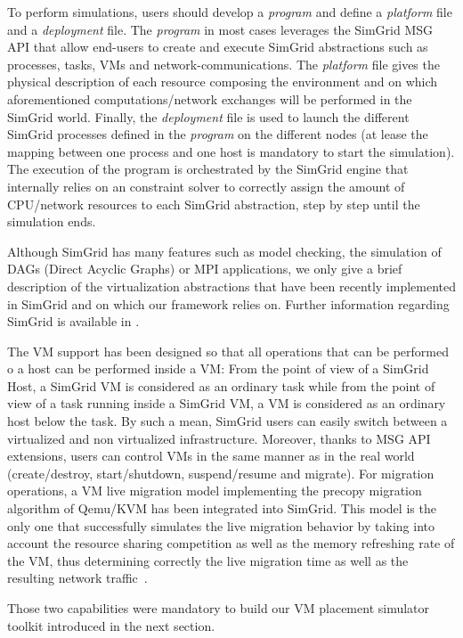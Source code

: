 \documentclass[conference]{IEEEtran}
\newcommand{\sg}{SimGrid\xspace}
\begin{document}
To perform simulations, users should develop a \emph{program} and
define a \emph{platform} file and a \emph{deployment} file. The
\emph{program} in most cases leverages the \sg MSG API that allow
end-users to create and execute \sg abstractions such as processes,
tasks, VMs and network-communications. The \emph{platform} file gives
the physical description of each resource composing the environment
and on which aforementioned computations/network exchanges will be
performed in the \sg
world.%
Finally, the \emph{deployment} file is used to launch the different
\sg processes defined in the \emph{program} on the different nodes (at
lease the mapping between one process and one host is mandatory to
start the simulation). The execution of the program is orchestrated by
the \sg engine that internally relies on an constraint solver to
correctly assign the amount of CPU/network resources to each \sg
abstraction, step by step until the simulation ends.

Although SimGrid has many features such as model checking, the
simulation of DAGs (Direct Acyclic Graphs) or MPI applications, we
only give a brief description of the  virtualization  abstractions
that have been recently implemented in \sg and on which our framework relies
on.  Further information regarding \sg is available in \cite{casanova:hal-01017319}.

The VM support has been designed so that all operations that can be performed
o a host can be performed inside a VM: From the point of view of a \sg
Host, a \sg VM is considered as an ordinary task while from the point
of view of a task running inside a \sg VM, a VM is considered as an
ordinary host below the task.  By such a mean, \sg users can easily
switch between a virtualized and non virtualized infrastructure.
Moreover, thanks to  MSG API extensions, users can control VMs in the
same manner as in the real world (\eg create/destroy, start/shutdown,
suspend/resume and migrate).
For migration operations, a VM live migration model implementing the
precopy migration algorithm of Qemu/KVM has been integrated into \sg.
This model is the only one that successfully simulates the live
migration behavior by taking into account the resource sharing
competition as well as the memory refreshing rate of the VM, thus
determining correctly the live migration time as well as the resulting
network traffic~\cite{Hirofuchi:2013:ALM:2568486.2568524}.

Those two capabilities were mandatory to build our VM placement
simulator toolkit introduced in the next section.
\end{document}
